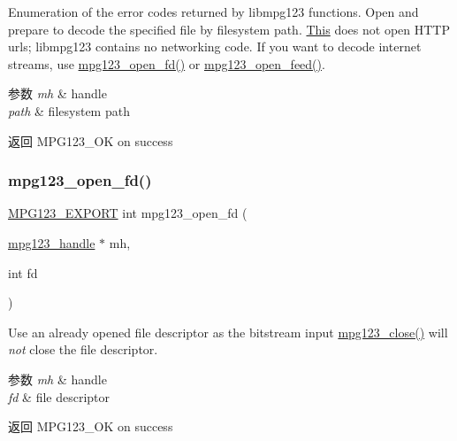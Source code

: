 Enumeration of the error codes returned by libmpg123 functions. Open and prepare to decode the specified file by filesystem path. \hyperlink{namespace_this}{This} does not open H\+T\+TP urls; libmpg123 contains no networking code. If you want to decode internet streams, use \hyperlink{group__mpg123__input_ga969c0cbe49b3831e18ad9e9e45c9d83e}{mpg123\+\_\+open\+\_\+fd()} or \hyperlink{group__mpg123__input_ga072669ae9bde29eea8cffa4be10c7345}{mpg123\+\_\+open\+\_\+feed()}. 
\begin{DoxyParams}{参数}
{\em mh} & handle \\
\hline
{\em path} & filesystem path \\
\hline
\end{DoxyParams}
\begin{DoxyReturn}{返回}
M\+P\+G123\+\_\+\+OK on success 
\end{DoxyReturn}
\mbox{\label{group__mpg123__input_ga969c0cbe49b3831e18ad9e9e45c9d83e}} 
\subsubsection{\texorpdfstring{mpg123\+\_\+open\+\_\+fd()}{mpg123\_open\_fd()}}
{\footnotesize\ttfamily \hyperlink{mpg123_8h_a2ba98cfba3f760879df70e755b2a61cc}{M\+P\+G123\+\_\+\+E\+X\+P\+O\+RT} int mpg123\+\_\+open\+\_\+fd (\begin{DoxyParamCaption}\item[{\hyperlink{group__mpg123__init_ga6728e2839a395f3a07d4514da659faca}{mpg123\+\_\+handle} $\ast$}]{mh,  }\item[{int}]{fd }\end{DoxyParamCaption})}

Use an already opened file descriptor as the bitstream input \hyperlink{group__mpg123__input_ga156eb0774196db868485662dc31621af}{mpg123\+\_\+close()} will {\itshape not} close the file descriptor. 
\begin{DoxyParams}{参数}
{\em mh} & handle \\
\hline
{\em fd} & file descriptor \\
\hline
\end{DoxyParams}
\begin{DoxyReturn}{返回}
M\+P\+G123\+\_\+\+OK on success 
\end{DoxyReturn}
\mbox{\label{group__mpg123__input_ga072669ae9bde29eea8cffa4be10c7345}} 
